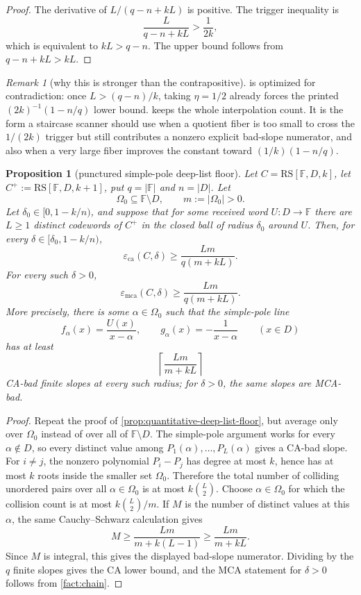\documentclass[11pt]{article}
\newtheorem{proposition}[proposition]{Proposition}
\theoremstyle{definition}
\theoremstyle{remark}
\newtheorem{remark}[remark]{Remark}
\newcommand{\F}{\mathbb{F}}
\newcommand{\RS}{\mathrm{RS}}
\newcommand{\eca}{\varepsilon_{\mathrm{ca}}}
\newcommand{\emca}{\varepsilon_{\mathrm{mca}}}
\begin{document}
\begin{proof}
The derivative of $L/(q-n+kL)$ is positive.  The trigger inequality is
\[
        \frac{L}{q-n+kL}>\frac1{2k},
\]
which is equivalent to $kL>q-n$.  The upper bound follows from
$q-n+kL>kL$.
\end{proof}

\begin{remark}[why this is stronger than the contrapositive]
\label{rem:quantitative-floor-vs-contrapositive}
 is optimized for contradiction: once $L>(q-n)/k$, taking
$\eta=1/2$ already forces the printed $(2k)^{-1}(1-n/q)$ lower bound.
 keeps the whole interpolation count.
It is the form a staircase scanner should use when a quotient fiber is too small
to cross the $1/(2k)$ trigger but still contributes a nonzero explicit bad-slope
numerator, and also when a very large fiber improves the constant toward
$(1/k)(1-n/q)$.
\end{remark}

\begin{proposition}[punctured simple-pole deep-list floor]
\label{prop:punctured-simple-pole-floor}
Let $C=\RS[\F,D,k]$, let $C^+:=\RS[\F,D,k+1]$, put
$q=|\F|$ and $n=|D|$.  Let
\[
        \Omega_0\subseteq \F\setminus D,
        \qquad m:=|\Omega_0|>0 .
\]
Let $\delta_0\in[0,1-k/n)$, and suppose that for some received word
$U:D\to\F$ there are $L\ge1$ distinct codewords of $C^+$ in the closed ball of
radius $\delta_0$ around $U$.  Then, for every
$\delta\in[\delta_0,1-k/n)$,
\[
        \eca(C,\delta)
        \ge
        \frac{Lm}{q(m+kL)} .
\]
For every such $\delta>0$,
\[
        \emca(C,\delta)
        \ge
        \frac{Lm}{q(m+kL)} .
\]
More precisely, there is some $\alpha\in\Omega_0$ such that the simple-pole line
\[
        f_\alpha(x)=\frac{U(x)}{x-\alpha},
        \qquad
        g_\alpha(x)=-\frac1{x-\alpha}
        \qquad (x\in D)
\]
has at least
\[
        \left\lceil\frac{Lm}{m+kL}\right\rceil
\]
CA-bad finite slopes at every such radius; for $\delta>0$, the same slopes are
MCA-bad.
\end{proposition}

\begin{proof}
Repeat the proof of \cref{prop:quantitative-deep-list-floor}, but average only
over $\Omega_0$ instead of over all of $\F\setminus D$.  The simple-pole
argument works for every $\alpha\notin D$, so every distinct value among
$P_1(\alpha),\ldots,P_L(\alpha)$ gives a CA-bad slope.  For $i\ne j$, the
nonzero polynomial $P_i-P_j$ has degree at most $k$, hence has at most $k$ roots
inside the smaller set $\Omega_0$.  Therefore the total number of colliding
unordered pairs over all $\alpha\in\Omega_0$ is at most $k\binom L2$.  Choose
$\alpha\in\Omega_0$ for which the collision count is at most
$k\binom L2/m$.  If $M$ is the number of distinct values at this $\alpha$, the
same Cauchy--Schwarz calculation gives
\[
        M\ge
        \frac{Lm}{m+k(L-1)}
        \ge
        \frac{Lm}{m+kL} .
\]
Since $M$ is integral, this gives the displayed bad-slope numerator.  Dividing
by the $q$ finite slopes gives the CA lower bound, and the MCA statement for
$\delta>0$ follows from \cref{fact:chain}.
\end{proof}
\end{document}

